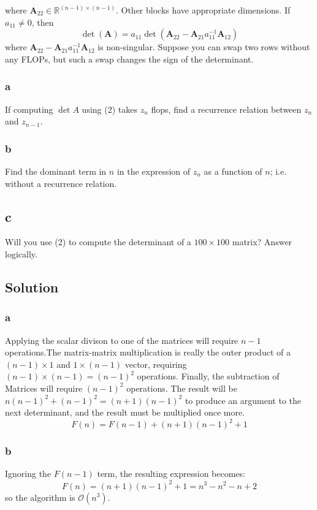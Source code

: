 \documentclass[11pt]{report}
\theoremstyle{definition}
\newcommand{\mat}[1]{\mathbf{#1}}
\begin{document}
where $\mat{A}_{22}\in\mathbb{R}^{(n-1)\times(n-1)}$. Other blocks have
appropriate dimensions.  If $a_{11}\neq 0$, then
\[ \det(\mat{A})=a_{11}\det(\mat{A}_{22}-\mat{A}_{21}a_{11}^{-1}\mat{A}_{12}) \]
where $\mat{A}_{22}-\mat{A}_{21}a_{11}^{-1}\mat{A}_{12}$ is non-singular.
Suppose you can swap two rows without any FLOPs, but such a swap changes the
sign of the determinant.

\subsubsection*{a}
If computing $\det{A}$ using (2) takes $z_n$ flops, find a recurrence relation
between $z_n$ and $z_{n-1}$.

\subsubsection*{b}
Find the dominant term in $n$ in the expression of $z_n$ as a function of $n$;
i.e. without a recurrence relation.

\subsection*{c}
Will you use (2) to compute the determinant of a $100\times 100$ matrix? Answer
logically.


\subsection*{Solution}
\subsubsection*{a}
Applying the scalar divison to one of the matrices will require $n-1$
operations.The matrix-matrix multiplication is really the outer product of a
$(n-1)\times 1$ and $1\times(n-1)$ vector, requiring $(n-1)\times(n-1)=(n-1)^2$
operations. Finally, the subtraction of Matrices will require $(n-1)^2$ operations.
The result will be $n(n-1)^2+(n-1)^2=(n+1)(n-1)^2$ to produce an argument to the
next determinant, and the result must be multiplied once more.
\[ F(n) = F(n-1) + (n+1)(n-1)^2 + 1 \]

\subsubsection*{b}
Ignoring the $F(n-1)$ term, the resulting expression becomes:
\[F(n) = (n+1)(n-1)^2+1 = n^3-n^2-n+2\]
so the algorithm is $\mathcal{O}(n^3)$.
\end{document}
